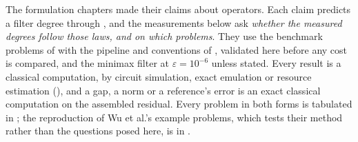 
The formulation chapters made their claims about operators. Each claim predicts a filter degree through , and the measurements below ask \emph{whether the measured degrees follow those laws, and on which problems}. They use the benchmark problems of  with the pipeline and conventions of , validated here before any cost is compared, and the minimax filter at $\varepsilon=10^{-6}$ unless stated. Every result is a classical computation, by circuit simulation, exact emulation or resource estimation (), and a gap, a norm or a reference's error is an exact classical computation on the assembled residual. Every problem in both forms is tabulated in ; the reproduction of Wu et al.'s example problems, which tests their method rather than the questions posed here, is in .


